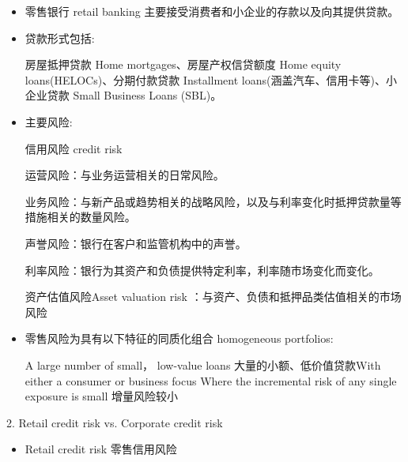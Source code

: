 \begin{itemize}
\item 零售银行 retail banking 主要接受消费者和小企业的存款以及向其提供贷款。

\item 贷款形式包括:

 房屋抵押贷款 Home mortgages、房屋产权信贷额度 Home equity loans(HELOCs)、分期付款贷款 Installment loans(涵盖汽车、信用卡等)、小企业贷款 Small Business Loans (SBL)。

\item 主要风险:

 信用风险 credit risk

 运营风险：与业务运营相关的日常风险。

 业务风险：与新产品或趋势相关的战略风险，以及与利率变化时抵押贷款量等措施相关的数量风险。
 
 声誉风险：银行在客户和监管机构中的声誉。
 
 利率风险：银行为其资产和负债提供特定利率，利率随市场变化而变化。

 资产估值风险Asset valuation risk ：与资产、负债和抵押品类估值相关的市场风险

\item 零售风险为具有以下特征的同质化组合 homogeneous portfolios:

 A large number of small， low-value loans 大量的小额、低价值贷款With either a consumer or business focus Where the incremental risk of any single exposure is small 增量风险较小

\end{itemize}


2. Retail credit risk vs. Corporate credit risk

\begin{itemize}
\item Retail credit risk 零售信用风险
\end{itemize}

